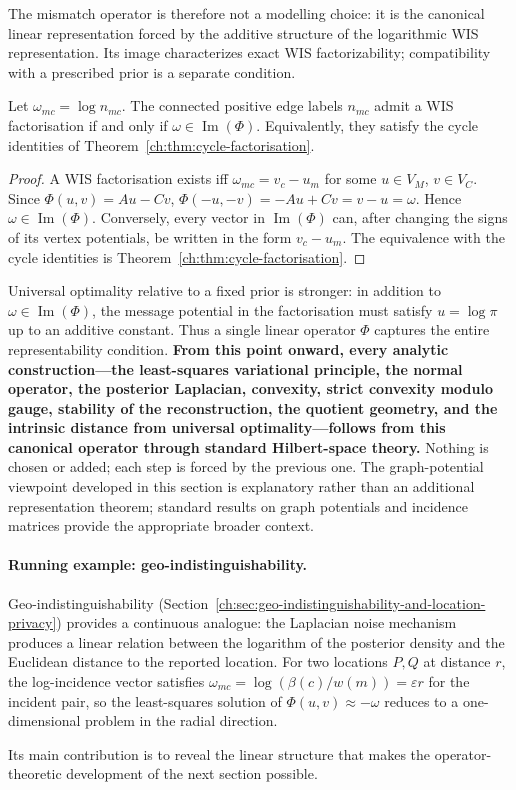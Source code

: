 The mismatch operator is therefore not a modelling choice: it is the
canonical linear representation forced by the additive structure of
the logarithmic WIS representation.  Its image characterizes exact WIS
factorizability; compatibility with a prescribed prior is a separate
condition.
\begin{theorem}\label{ch:thm:operator-wis}
Let $\omega_{mc}=\log n_{mc}$.  The connected positive edge labels $n_{mc}$
admit a WIS factorisation if and only if
$\omega\in\operatorname{Im}(\Phi)$.  Equivalently, they satisfy the
cycle identities of Theorem~\ref{ch:thm:cycle-factorisation}.
\end{theorem}
\begin{proof}
A WIS factorisation exists iff
$\omega_{mc}=v_c-u_m$ for some $u\in V_M$, $v\in V_C$.  Since
$\Phi(u,v)=Au-Cv$, $\Phi(-u,-v) = -Au + Cv = v - u = \omega.$ Hence $\omega\in\operatorname{Im}(\Phi)$.  Conversely, every vector
in $\operatorname{Im}(\Phi)$ can, after changing the signs of its
vertex potentials, be written in the form $v_c-u_m$.  The equivalence
with the cycle identities is Theorem~\ref{ch:thm:cycle-factorisation}.
\end{proof}

Universal optimality relative to a fixed prior is stronger: in addition
to $\omega\in\operatorname{Im}(\Phi)$, the message potential in the
factorisation must satisfy $u=\log\pi$ up to an additive constant.
Thus a single linear operator $\Phi$ captures the entire
representability condition.  \textbf{From this point onward, every
analytic construction---the least-squares variational principle, the
normal operator, the posterior Laplacian, convexity, strict convexity
modulo gauge, stability of the reconstruction, the quotient geometry,
and the intrinsic distance from universal optimality---follows from
this canonical operator through standard Hilbert-space theory.}
Nothing is chosen or added; each step is forced by the previous one.
The graph-potential viewpoint developed in this section is explanatory
rather than an additional representation theorem; standard results on
graph potentials and incidence matrices provide the appropriate broader
context.  \paragraph{Running example: geo-indistinguishability.}
Geo-indistinguishability (Section~\ref{ch:sec:geo-indistinguishability-and-location-privacy}) provides a continuous analogue: the Laplacian noise mechanism produces a linear relation between the logarithm of the posterior density and the Euclidean distance to the reported location.  For two locations $P,Q$ at distance $r$, the log-incidence vector satisfies $\omega_{mc}=\log(\beta(c)/w(m))=\varepsilon r$ for the incident pair, so the least-squares solution of $\Phi(u,v)\approx-\omega$ reduces to a one-dimensional problem in the radial direction.

Its main contribution is to reveal the linear structure that
makes the operator-theoretic development of the next section possible.
\endinput
